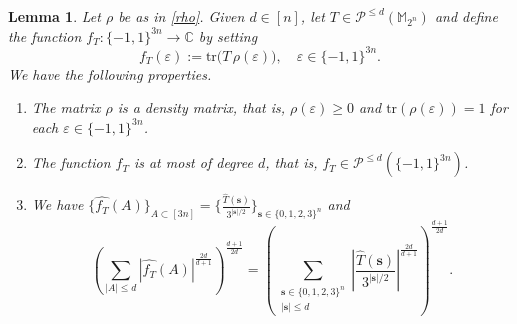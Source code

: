 \documentclass{amsbook}
\newtheorem{lemma}[theorem]{Lemma}
\theoremstyle{definition}
\theoremstyle{remark}
\numberwithin{section}{chapter}
\numberwithin{equation}{chapter}
\newcommand{\M}{\mathbb{M}}
\newcommand{\1}{\mathbf{1}}
\newcommand{\s}{\mathbf{s}}
\begin{document}
\begin{lemma}\label{lem rho}
Let $\rho$ be as in \eqref{rho}. Given $d\in [n]$, let $T\in \mathcal{P}^{\leq d}(\M_{2^n})$ and define the function \(f_T:\{-1,1\}^{3n}\to\mathbb C\)  by setting
	\[
	f_T(\varepsilon):=\mathrm{tr}\big(T\,\rho(\varepsilon)\big),\quad \varepsilon \in \{-1,1\}^{3n}.
	\]
We have the following  properties.
\begin{enumerate}[{\rm (i)}]
\item The matrix  $\rho$ is a density matrix, that is,  \(\rho(\varepsilon)\geq 0\) and \(\mathrm{tr}(\rho(\varepsilon))=1\) for each $\varepsilon \in \{-1,1\}^{3n}$.
\item 
 The function $f_T$ is at most of degree $d$, that is, $f_T\in \mathcal{P}^{\leq d}(\{-1,1\}^{3n})$. 
\item We have $\{\widehat{f_T}(A)\}_{A\subset[3n]}=\{\frac{\widehat{T}(\s)}{3^{|\s|/2}}\}_{\mathbf{s}\in\{0,1,2,3\}^n}$ and 
\begin{equation}\label{fT T}
\left(\sum_{|A|\leq d}|\widehat{f_T}(A)|^{\frac{2d}{d+1}}\right)^{\frac{d+1}{2d}}=\left(\sum_{\substack{\s\in\{0,1,2,3\}^{n}\\|\s|\leq d}}\left|\frac{\widehat{T}(\s)}{3^{|\s|/2}}\right|^{\frac{2d}{d+1}}\right)^{\frac{d+1}{2d}}.
\end{equation}
\end{enumerate}
\end{lemma}
\end{document}
